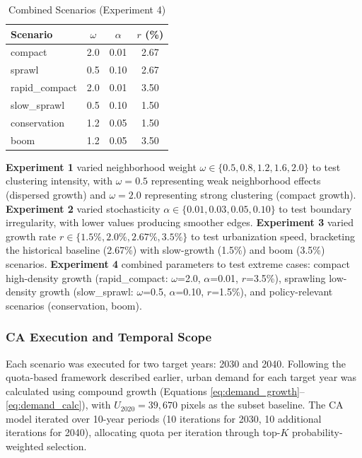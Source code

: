 \documentclass[conference]{IEEEtran}
\begin{document}
\begin{table}[!t]
\caption{Combined Scenarios (Experiment 4)}
\label{tab:combined}
\centering
\small
\renewcommand{\arraystretch}{1.2}
\begin{tabular}{lccc}
\toprule
\textbf{Scenario} & \textbf{$\omega$} & \textbf{$\alpha$} & \textbf{$r$ (\%)} \\
\midrule
compact & 2.0 & 0.01 & 2.67 \\
sprawl & 0.5 & 0.10 & 2.67 \\
rapid\_compact & 2.0 & 0.01 & 3.50 \\
slow\_sprawl & 0.5 & 0.10 & 1.50 \\
conservation & 1.2 & 0.05 & 1.50 \\
boom & 1.2 & 0.05 & 3.50 \\
\bottomrule
\end{tabular}
\end{table}

\textbf{Experiment 1} varied neighborhood weight $\omega \in \{0.5, 0.8, 1.2, 1.6, 2.0\}$ to test clustering intensity, with $\omega=0.5$ representing weak neighborhood effects (dispersed growth) and $\omega=2.0$ representing strong clustering (compact growth). \textbf{Experiment 2} varied stochasticity $\alpha \in \{0.01, 0.03, 0.05, 0.10\}$ to test boundary irregularity, with lower values producing smoother edges. \textbf{Experiment 3} varied growth rate $r \in \{1.5\%, 2.0\%, 2.67\%, 3.5\%\}$ to test urbanization speed, bracketing the historical baseline (2.67\%) with slow-growth (1.5\%) and boom (3.5\%) scenarios. \textbf{Experiment 4} combined parameters to test extreme cases: compact high-density growth (rapid\_compact: $\omega$=2.0, $\alpha$=0.01, $r$=3.5\%), sprawling low-density growth (slow\_sprawl: $\omega$=0.5, $\alpha$=0.10, $r$=1.5\%), and policy-relevant scenarios (conservation, boom).

\subsubsection{CA Execution and Temporal Scope}

Each scenario was executed for two target years: 2030 and 2040. Following the quota-based framework described earlier, urban demand for each target year was calculated using compound growth (Equations \ref{eq:demand_growth}--\ref{eq:demand_calc}), with $U_{2020} = 39{,}670$ pixels as the subset baseline. The CA model iterated over 10-year periods (10 iterations for 2030, 10 additional iterations for 2040), allocating quota per iteration through top-$K$ probability-weighted selection.
\end{document}
